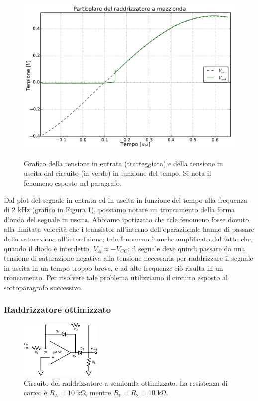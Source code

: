 \begin{figure}[ht]
 \centering
   {\includegraphics[width=14.5cm]{../E05/latex/zoom.pdf}}
 \caption{Grafico della tensione in entrata (tratteggiata) e della tensione in uscita dal circuito (in verde) in funzione del tempo. Si nota il fenomeno esposto nel paragrafo.}
 \label{gr5:problema}
\end{figure}

Dal plot del segnale in entrata ed in uscita in funzione del tempo alla frequenza di 2 \si{\kilo\hertz} (grafico in Figura \ref{gr5:problema}), possiamo notare un troncamento della forma d'onda del segnale in uscita. Abbiamo ipotizzato che tale fenomeno fosse dovuto alla limitata velocità che i transistor all'interno dell'operazionale hanno di passare dalla saturazione all'interdizione; tale fenomeno è anche amplificato dal fatto che, quando il diodo è interdetto, $V_{A} \approx -V_{CC}$: il segnale deve quindi passare da una tensione di saturazione negativa alla tensione necessaria per raddrizzare il segnale in uscita in un tempo troppo breve, e ad alte frequenze ciò risulta in un troncamento. Per risolvere tale problema utilizziamo il circuito esposto al sottoparagrafo successivo.

\subsubsection{Raddrizzatore ottimizzato}

\begin{figure}
  \begin{center}
    \includegraphics[width=0.350\textwidth]{../E05/latex/c_rectifier_B.pdf}
  \end{center}
  \caption{Circuito del raddrizzatore a semionda ottimizzato. La resistenza di carico è $R_L=10$ \si{\kilo\ohm}, mentre $R_1=R_2=10$ \si{\kilo\ohm}.}
  \label{cir5:raddrizz_2}
\end{figure}

